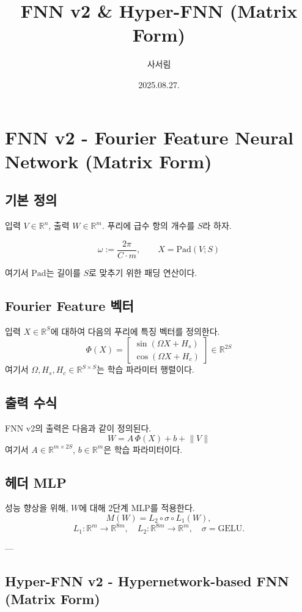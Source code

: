\documentclass{book}
\title{FNN v2 \& Hyper-FNN (Matrix Form)}
\author{사서림}
\date{2025.08.27.}
\begin{document}
\maketitle
\tableofcontents

\chapter{FNN v2 - Fourier Feature Neural Network (Matrix Form)}

\section{기본 정의}
입력 $V \in \mathbb{R}^n$, 출력 $W \in \mathbb{R}^m$.
푸리에 급수 항의 개수를 $S$라 하자.

\[
\omega := \frac{2\pi}{C \cdot m}, \qquad
X = \text{Pad}(V; S)
\]

여기서 $\text{Pad}$는 길이를 $S$로 맞추기 위한 패딩 연산이다.

\section{Fourier Feature 벡터}
입력 $X \in \mathbb{R}^S$에 대하여 다음의 푸리에 특징 벡터를 정의한다.
\[
\Phi(X) =
\begin{bmatrix}
\sin(\Omega X + H_s) \\
\cos(\Omega X + H_c)
\end{bmatrix}
\in \mathbb{R}^{2S}
\]
여기서 $\Omega, H_s, H_c \in \mathbb{R}^{S \times S}$는 학습 파라미터 행렬이다.

\section{출력 수식}
FNN v2의 출력은 다음과 같이 정의된다.
\[
W = A \, \Phi(X) + b + \lVert V \rVert
\]
여기서 $A \in \mathbb{R}^{m \times 2S}$, $b \in \mathbb{R}^m$은 학습 파라미터이다.

\section{헤더 MLP}
성능 향상을 위해, $W$에 대해 2단계 MLP를 적용한다.
\[
M(W) = L_2 \circ \sigma \circ L_1(W),
\]
\[
L_1:\mathbb{R}^m \to \mathbb{R}^{8m}, \quad
L_2:\mathbb{R}^{8m} \to \mathbb{R}^m, \quad
\sigma=\text{GELU}.
\]

---

\section{Hyper-FNN v2 - Hypernetwork-based FNN (Matrix Form)}
\end{document}
